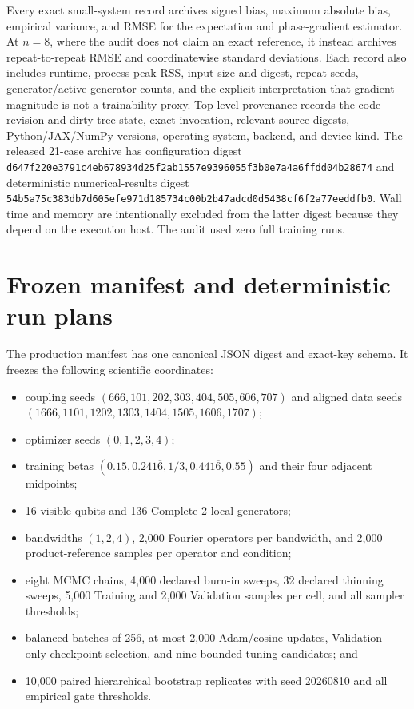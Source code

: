 Every exact small-system record archives signed bias, maximum absolute bias,
empirical variance, and RMSE for the expectation and phase-gradient estimator.
At $n=8$, where the audit does not claim an exact reference, it instead
archives repeat-to-repeat RMSE and coordinatewise standard deviations.  Each
record also includes runtime, process peak RSS, input size and digest, repeat
seeds, generator/active-generator counts, and the explicit interpretation that
gradient magnitude is not a trainability proxy.  Top-level provenance records
the code revision and dirty-tree state, exact invocation, relevant source
digests, Python/JAX/NumPy versions, operating system, backend, and device kind.
The released 21-case archive
has configuration digest
\texttt{d647f220e3791c4eb678934d25f2ab1557e9396055f3b0e7a4a6ffdd04b28674}
and deterministic numerical-results digest
\texttt{54b5a75c383db7d605efe971d185734c00b2b47adcd0d5438cf6f2a77eeddfb0}.
Wall time and memory are intentionally excluded from the latter digest because
they depend on the execution host.  The audit used zero full training runs.

\section{Frozen manifest and deterministic run plans}
\label{app:manifest}

The production manifest has one canonical JSON digest and exact-key schema.
It freezes the following scientific coordinates:
\begin{itemize}
\item coupling seeds $(666,101,202,303,404,505,606,707)$ and aligned data
seeds $(1666,1101,1202,1303,1404,1505,1606,1707)$;
\item optimizer seeds $(0,1,2,3,4)$;
\item training betas
$(0.15,0.241\overline6,1/3,0.441\overline6,0.55)$ and their four adjacent
midpoints;
\item 16 visible qubits and 136 Complete 2-local generators;
\item bandwidths $(1,2,4)$, 2,000 Fourier operators per bandwidth, and 2,000
product-reference samples per operator and condition;
\item eight MCMC chains, 4,000 declared burn-in sweeps, 32 declared thinning
sweeps, 5,000 Training and 2,000 Validation samples per cell, and all sampler
thresholds;
\item balanced batches of 256, at most 2,000 Adam/cosine updates, Validation-
only checkpoint selection, and nine bounded tuning candidates; and
\item 10,000 paired hierarchical bootstrap replicates with seed 20260810 and
all empirical gate thresholds.
\end{itemize}

